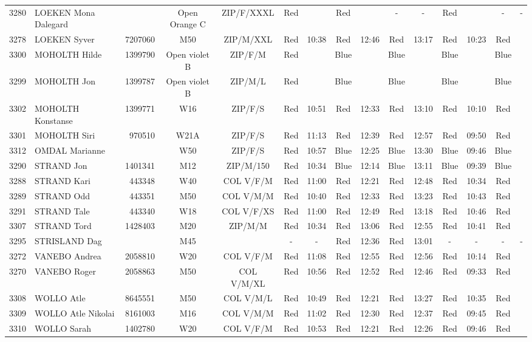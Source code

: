 \documentclass{report}
\begin{document}
\begin{longtable}{|c|l|r|c|c|*{5}{cc|}}
    3280 & LOEKEN Mona Dalegard &  & Open Orange C & ZIP/F/XXXL & Red &   & Red &   & - &  - & Red &   & - &  -\\
    3278 & LOEKEN Syver & 7207060 & M50 & ZIP/M/XXL & Red & 10:38 & Red & 12:46 & Red & 13:17 & Red & 10:23 & Red &  \\
    3300 & MOHOLTH Hilde & 1399790 & Open violet B & ZIP/F/M & Red &   & Blue &   & Blue &   & Blue &   & Blue &  \\
    3299 & MOHOLTH Jon & 1399787 & Open violet B & ZIP/M/L & Red &   & Blue &   & Blue &   & Blue &   & Blue &  \\
    3302 & MOHOLTH Konstanse & 1399771 & W16 & ZIP/F/S & Red & 10:51 & Red & 12:33 & Red & 13:10 & Red & 10:10 & Red &  \\
    3301 & MOHOLTH Siri & 970510 & W21A & ZIP/F/S & Red & 11:13 & Red & 12:39 & Red & 12:57 & Red & 09:50 & Red &  \\
    3312 & OMDAL Marianne &  & W50 & ZIP/F/S & Red & 10:57 & Blue & 12:25 & Blue & 13:30 & Blue & 09:46 & Blue &  \\
    3290 & STRAND Jon & 1401341 & M12 & ZIP/M/150 & Red & 10:34 & Blue & 12:14 & Blue & 13:11 & Blue & 09:39 & Blue &  \\
    3288 & STRAND Kari & 443348 & W40 & COL V/F/M & Red & 11:00 & Red & 12:21 & Red & 12:48 & Red & 10:34 & Red &  \\
    3289 & STRAND Odd & 443351 & M50 & COL V/M/M & Red & 10:40 & Red & 12:33 & Red & 13:23 & Red & 10:43 & Red &  \\
    3291 & STRAND Tale & 443340 & W18 & COL V/F/XS & Red & 11:00 & Red & 12:49 & Red & 13:18 & Red & 10:46 & Red &  \\
    3307 & STRAND Tord & 1428403 & M20 & ZIP/M/M & Red & 10:34 & Red & 13:06 & Red & 12:55 & Red & 10:41 & Red &  \\
    3295 & STRISLAND Dag &  & M45 &   & - &  - & Red & 12:36 & Red & 13:01 & - &  - & - &  -\\
    3272 & VANEBO Andrea & 2058810 & W20 & COL V/F/M & Red & 11:08 & Red & 12:55 & Red & 12:56 & Red & 10:14 & Red &  \\
    3270 & VANEBO Roger & 2058863 & M50 & COL V/M/XL & Red & 10:56 & Red & 12:52 & Red & 12:46 & Red & 09:33 & Red &  \\
    3308 & WOLLO Atle & 8645551 & M50 & COL V/M/L & Red & 10:49 & Red & 12:21 & Red & 13:27 & Red & 10:35 & Red &  \\
    3309 & WOLLO Atle Nikolai & 8161003 & M16 & COL V/M/M & Red & 11:02 & Red & 12:30 & Red & 12:37 & Red & 09:45 & Red &  \\
    3310 & WOLLO Sarah & 1402780 & W20 & COL V/F/M & Red & 10:53 & Red & 12:21 & Red & 12:26 & Red & 09:46 & Red &  \\
  \end{longtable}
\end{document}
